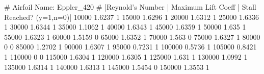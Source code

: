 # Airfoil Name: Eppler_420
# |Reynold's Number | Maximum Lift Coeff | Stall Reached? (y=1,n=0)|
10000 1.6237 1
15000 1.6296 1
20000 1.6312 1
25000 1.6336 1
30000 1.6344 1
35000 1.1062 1
40000 1.6343 1
45000 1.6359 1
50000 1.635 1
55000 1.6323 1
60000 1.5159 0
65000 1.6352 1
70000 1.563 0
75000 1.6327 1
80000 0   0
85000 1.2702 1
90000 1.6307 1
95000 0.7231 1
100000 0.5736 1
105000 0.8421 1
110000 0 0
115000 1.6304 1
120000 1.6305 1
125000 1.631 1
130000 1.0992 1
135000 1.6314 1
140000 1.6313 1
145000 1.5454 0
150000 1.3553 1
